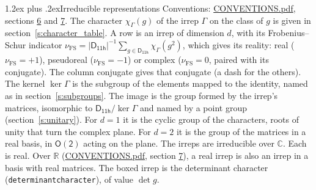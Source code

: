 \documentclass[10pt,a4paper]{article}
\makeatletter
\renewcommand\section{\@startsection{section}{1}{\z@}{-3ex plus -1ex minus -.2ex}%
  {1.2ex plus .2ex}{\normalfont\large\sffamily\bfseries\color{parttitle}}}
\numberwithin{equation}{section}
\newcommand{\grp}[1]{\mathsf{#1}}
\newcommand{\irchar}[1]{\chi_{#1}}
\newcommand{\fsind}{\nu_{\mathrm{FS}}}
\makeatother
\begin{document}
\section{Irreducible representations}\label{s:irreps}
Conventions: \href{../../CONVENTIONS.pdf}{CONVENTIONS.pdf}, sections \href{../../CONVENTIONS.pdf\#conv.6}{6} and \href{../../CONVENTIONS.pdf\#conv.7}{7}.
\leavevmode\label{n:function.character}\label{n:irrep.Gamma}The character $\irchar{\Gamma}(g)$ of the irrep $\Gamma$ on the class of $g$ is given in section~\ref{s:character_table}.
\leavevmode\label{n:index.dimension}\label{n:index.frobenius}\label{n:head.irrep}\label{n:head.reality}A row is an irrep of dimension $d$, with its Frobenius--Schur indicator $\fsind = |\grp{D_{11h}}|^{-1}\allowbreak\sum_{g\in\grp{D_{11h}}}\irchar{\Gamma}(g^2)$, which gives its reality: real ($\fsind = +1$), pseudoreal ($\fsind = -1$) or complex ($\fsind = 0$, paired with its conjugate). \label{n:head.conjugate}The column conjugate gives that conjugate (a dash for the others). \label{n:head.kernel}The kernel $\ker\Gamma$ is the subgroup of the elements mapped to the identity, named as in section~\ref{s:subgroups}. \label{n:head.image}The image is the group formed by the irrep's matrices, isomorphic to $\grp{D_{11h}}/\ker\Gamma$ and named by a point group (section~\ref{s:unitary}). For $d = 1$ it is the cyclic group of the characters, roots of unity that turn the complex plane. For $d = 2$ it is the group of the matrices in a real basis, in $\grp{O(2)}$ acting on the plane. The irreps are irreducible over $\mathbb{C}$. Each is real. Over $\mathbb{R}$ (\href{../../CONVENTIONS.pdf}{CONVENTIONS.pdf}, section \href{../../CONVENTIONS.pdf\#conv.7}{7}), a real irrep is also an irrep in a basis with real matrices. \label{n:mark.determinant}The boxed irrep is the determinant character (\texttt{determinantcharacter}), of value $\det g$.
\setlength{\emergencystretch}{2em}\par\setlength{\emergencystretch}{0pt}
\end{document}
